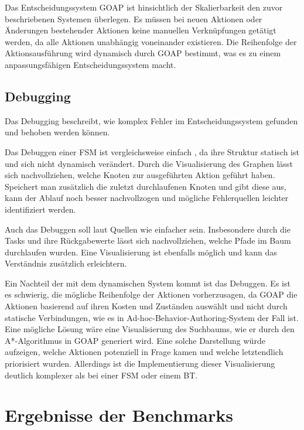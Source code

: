 Das Entscheidungssystem GOAP ist hinsichtlich der Skalierbarkeit den zuvor beschriebenen Systemen \"{u}berlegen. Es m\"{u}ssen bei neuen Aktionen oder \"{A}nderungen bestehender Aktionen keine manuellen Verkn\"{u}pfungen get\"{a}tigt werden, da alle Aktionen unabh\"{a}ngig voneinander existieren. Die Reihenfolge der Aktionsausf\"{u}hrung wird dynamisch durch GOAP bestimmt, was es zu einem anpassungsf\"{a}higen Entscheidungssystem macht.


\subsection{Debugging}
\label{chap:debugging}

Das Debugging beschreibt, wie komplex Fehler im Entscheidungssystem gefunden und behoben werden k\"{o}nnen. 

Das Debuggen einer FSM ist vergleichsweise einfach \autocite{review_game_ai}, da ihre Struktur statisch ist und sich nicht dynamisch ver\"{a}ndert. Durch die Visualisierung des Graphen l\"{a}sst sich nachvollziehen, welche Knoten zur ausgef\"{u}hrten Aktion gef\"{u}hrt haben. Speichert man zus\"{a}tzlich die zuletzt durchlaufenen Knoten und gibt diese aus, kann der Ablauf noch besser nachvollzogen und m\"{o}gliche Fehlerquellen leichter identifiziert werden.

Auch das Debuggen soll laut Quellen wie \autocite{aiag, review_game_ai} einfacher sein. Insbesondere durch die Tasks und ihre R\"{u}ckgabewerte l\"{a}sst sich nachvollziehen, welche Pfade im Baum durchlaufen wurden. Eine Visualisierung ist ebenfalls m\"{o}glich und kann das Verst\"{a}ndnis zus\"{a}tzlich erleichtern.

Ein Nachteil der mit dem dynamischen System kommt ist das Debuggen. Es ist es schwierig, die m\"{o}gliche Reihenfolge der Aktionen vorherzusagen, da GOAP die Aktionen basierend auf ihren Kosten und Zust\"{a}nden ausw\"{a}hlt und nicht durch statische Verbindungen, wie es in Ad-hoc-Behavior-Authoring-System der Fall ist. Eine m\"{o}gliche L\"{o}sung w\"{a}re eine Visualisierung des Suchbaums, wie er durch den A*-Algorithmus in GOAP generiert wird. Eine solche Darstellung w\"{u}rde aufzeigen, welche Aktionen potenziell in Frage kamen und welche letztendlich priorisiert wurden. Allerdings ist die Implementierung dieser Visualisierung deutlich komplexer als bei einer FSM oder einem BT.


\section{Ergebnisse der Benchmarks}
\label{chap:erbnisse benchmark}

